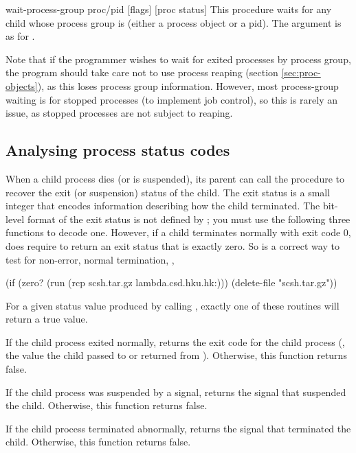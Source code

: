 \begin{defundesc} {wait-process-group} {proc/pid [flags]} {[proc status]}
    This procedure waits for any child whose process group is 
    (either a process object or a pid).
    The  argument is as for .

    Note that if the programmer wishes to wait for exited processes
    by process group, the program should take care not to use process
    reaping (section \ref{sec:proc-objects}), as this loses
    process group information. However, most process-group waiting is
    for stopped processes (to implement job control), so this is rarely
    an issue, as stopped processes are not subject to reaping.
\end{defundesc}


\subsection{Analysing process status codes}
\label{sec:wait-codes}
When a child process dies (or is suspended), its parent can call the 
procedure to recover the exit (or suspension) status of the child.
The exit status is a small integer that encodes information
describing how the child terminated.
The bit-level format of the exit status is not defined by {\Posix};
you must use the following three functions to decode one.
However, if a child terminates normally with exit code 0,
{\Posix} does require  to return an exit status that is exactly
zero.
So  is a correct way to test for non-error, 
normal termination, \eg,
\begin{code}
(if (zero? (run (rcp scsh.tar.gz lambda.csd.hku.hk:)))
    (delete-file "scsh.tar.gz"))\end{code}

\begin{desc}
For a given status value produced by calling ,
exactly one of these routines will return a true value.

If the child process exited normally,  returns the
exit code for the child process (\ie, the value the child passed to  
or returned from ). Otherwise, this function returns false.

If the child process was suspended by a signal, 
returns the signal that suspended the child.
Otherwise, this function returns false.

If the child process terminated abnormally, 
returns the signal that terminated the child.
Otherwise, this function returns false.
\end{desc}

